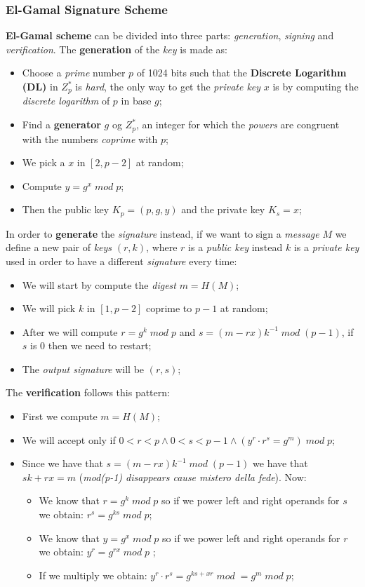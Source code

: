 \documentclass{article}
\begin{document}
\subsubsection{El-Gamal Signature Scheme}
\textbf{El-Gamal scheme} can be divided into three parts: \emph{generation}, \emph{signing} and \emph{verification}. The \textbf{generation} of the \emph{key} is made as:
\begin{itemize}
\item Choose a \emph{prime} number $p$ of 1024 bits such that the \textbf{Discrete Logarithm} \textbf{(DL)} in $Z_p^{*}$ is \emph{hard}, the only way to get the \emph{private key} $x$ is by computing the \emph{discrete logarithm} of $p$ in base $g$; 
\item Find a \textbf{generator} $g$ og $Z_p^{*}$, an integer for which the \emph{powers} are congruent with the numbers \emph{coprime} with $p$; 
\item We pick a $x$ in $\left [ 2 , p-2 \right ]$ at random;
\item Compute $y= g^x \; mod\; p$; 
\item Then the public key $K_p = (p,g,y)$ and the private key $K_s = x$;
\end{itemize}
In order to \textbf{generate} the \emph{signature} instead, if we want to sign a \emph{message} $M$ we define a new pair of \emph{keys} $(r,k)$, where $r$ is a \emph{public key} instead $k$ is a \emph{private key} used in order to have a different \emph{signature} every time:
\begin{itemize}
\item We will start by compute the \emph{digest} $m = H(M)$;
\item We will pick $k$ in $\left[ 1, p-2 \right]$ coprime to $p-1$ at random;
\item After we will compute $r = g^k\; mod \; p$ and $s = (m-rx)k^{-1} \; mod\; (p-1)$, if $s$ is 0 then we need to restart; 
\item The \emph{output signature} will be $(r,s)$;
\end{itemize}
The \textbf{verification} follows this pattern:
\begin{itemize}
\item First we compute $m=H(M)$;
\item We will accept only if $0<r<p \wedge 0<s<p-1 \wedge (y^r \cdot r^s = g^m)\; mod\; p$;
\item Since we have that $s = (m-rx)k^{-1} \; mod\; (p-1)$ we have that $sk +rx = m$ (\emph{mod(p-1) disappears cause mistero della fede}). Now:
\begin{itemize}
\item We know that $r=g^k\; mod\; p$ so if we power left and right operands for $s$ we obtain: $r^s = g^{ks} \; mod	\; p$;
\item We know that $y=g^x\; mod\; p$ so if we power left and right operands for $r$ we obtain: $y^r = g^{rx}\; mod	\; p$ ;
\item If we multiply we obtain: $y^r \cdot r^s = g^{ks + xr} \; mod	\; = g^m \; mod\; p$;
\end{itemize}
\end{itemize}
\end{document}
